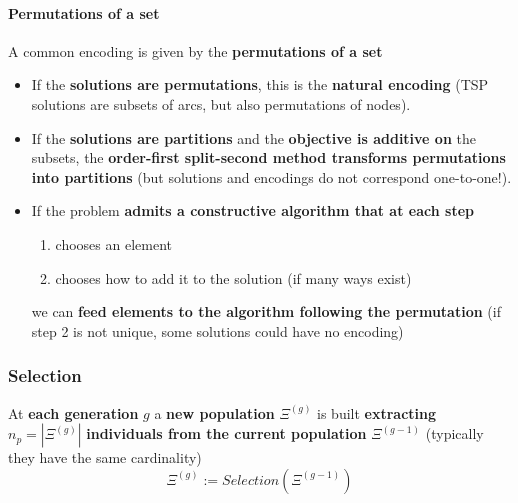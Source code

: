 \newpage

\paragraph{Permutations of a set}

A common encoding is given by the \textbf{permutations of a set}
\begin{itemize}
	\item If the \textbf{solutions are permutations}, this is the \textbf{natural encoding} (TSP solutions are subsets of arcs, but also permutations of nodes).\\
	
	\item If the \textbf{solutions are partitions} and the \textbf{objective is additive on} the subsets, the \textbf{order-first split-second method transforms permutations into partitions} (but solutions and encodings do not correspond one-to-one!).\\
	
	\item If the problem \textbf{admits a constructive algorithm that at each step}
	\begin{enumerate}
		\item chooses an element
		\item chooses how to add it to the solution (if many ways exist)
	\end{enumerate}
	we can \textbf{feed elements to the algorithm following the permutation} (if step 2 is not unique, some solutions could have no encoding)
\end{itemize}

\newpage

\subsubsection{Selection}

At \textbf{each generation} $g$ a \textbf{new population} $\Xi^{(g)}$ is built \textbf{extracting} $n_p = |\Xi^{(g )}|$ \textbf{individuals from the current population} $\Xi^{(g-1)}$ (typically they have the same cardinality)
$$ \Xi^{(g )} := Selection(\Xi^{(g −1)}) $$

